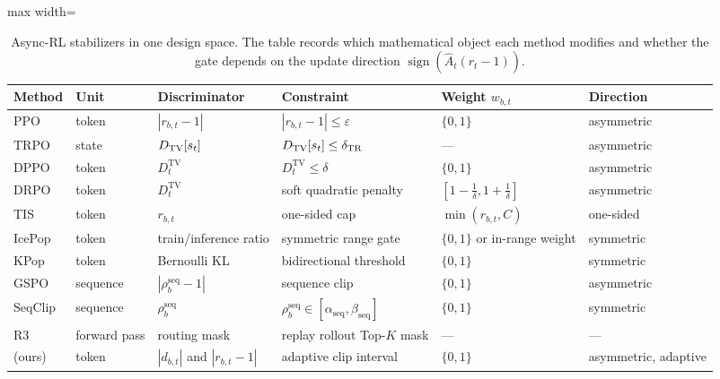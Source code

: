 \begin{table}[t]
\centering
\caption{Async-RL stabilizers in one design space. The table records which mathematical object each method modifies and whether the gate depends on the update direction $\operatorname{sign}(\hat A_t(r_t-1))$.}
\label{tab:designspace}
\small
\setlength{\tabcolsep}{5pt}
\begin{adjustbox}{max width=\textwidth}
\begin{tabular}{@{}llllll@{}}
\toprule
Method & Unit & Discriminator & Constraint & Weight $w_{b,t}$ & Direction \\
\midrule
PPO~\citep{schulman2017ppo} & token & $|r_{b,t}-1|$ & $|r_{b,t}-1|\le\varepsilon$ & $\{0,1\}$ & asymmetric \\
TRPO~\citep{schulman2015trpo} & state & $D_{\mathrm{TV}}[s_t]$ & $D_{\mathrm{TV}}[s_t]\le\delta_{\mathrm{TR}}$ & --- & asymmetric \\
DPPO~\citep{qi2026dppo} & token & $D_t^{\mathrm{TV}}$ & $D_t^{\mathrm{TV}}\le\delta$ & $\{0,1\}$ & asymmetric \\
DRPO~\citep{yao2026drpo} & token & $D_t^{\mathrm{TV}}$ & soft quadratic penalty & $[1-\tfrac1\delta,1+\tfrac1\delta]$ & asymmetric \\
TIS~\citep{zheng2025tis} & token & $r_{b,t}$ & one-sided cap & $\min(r_{b,t},C)$ & one-sided \\
IcePop~\citep{zhao2025icepop,hou2026sao} & token & train/inference ratio & symmetric range gate & $\{0,1\}$ or in-range weight & symmetric \\
KPop~\citep{guo2026kpop} & token & Bernoulli KL & bidirectional threshold & $\{0,1\}$ & symmetric \\
GSPO~\citep{zheng2025gspo} & sequence & $|\rho_b^{\mathrm{seq}}-1|$ & sequence clip & $\{0,1\}$ & asymmetric \\
SeqClip~\citep{tencent2025seqclip} & sequence & $\rho_b^{\mathrm{seq}}$ & $\rho_b^{\mathrm{seq}}\in[\alpha_{\mathrm{seq}},\beta_{\mathrm{seq}}]$ & $\{0,1\}$ & symmetric \\
R3~\citep{ma2025r3} & forward pass & routing mask & replay rollout Top-$K$ mask & --- & --- \\
\rowcolor{metabg!8}
\satr{} (ours) & token & $|d_{b,t}|$ and $|r_{b,t}-1|$ & adaptive clip interval & $\{0,1\}$ & asymmetric, adaptive \\
\bottomrule
\end{tabular}
\end{adjustbox}
\end{table}


